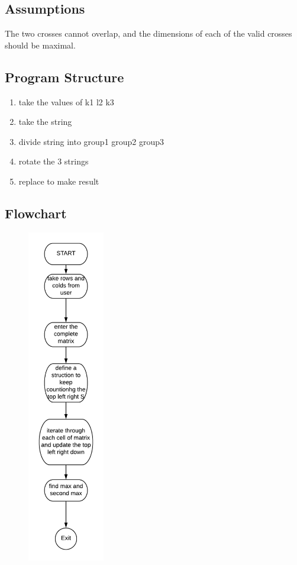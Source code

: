 \documentclass[12pt]{article}
\begin{document}
\subsection{Assumptions}
{
The two crosses cannot overlap, and the dimensions of each of the valid crosses should be maximal.


}

\subsection{Program Structure}
{
\begin{enumerate}
\item take the values of k1 l2 k3
\item take the string
\item divide string into group1 group2 group3
\item rotate the 3 strings
\item replace to make result
   

 
\end{enumerate} 
}

\newpage
\subsection{Flowchart}
\begin{figure}[h]
	\centering
\includegraphics[width=0.3\textwidth]{ps1flow.png}\\
\end{figure}
\newpage
\end{document}

